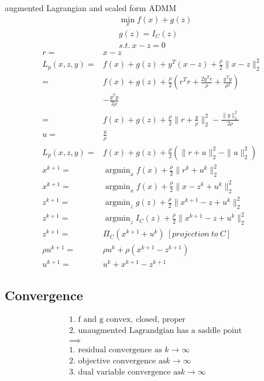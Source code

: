 \documentclass[8pt]{report}
\DeclareMathOperator*{\argmin}{argmin}
\newcommand{\norm}[1]{\|#1\|}
\begin{document}
\begin{multicols*}{2}
  augmented Lagrangian and scaled form ADMM
  \begin{align*}
    &\min_x f(x) + g(z)\\
    &g(z) = I_C(z)\\
    &s.t.\ x-z=0
  \end{align*}
  \begin{align*}
    r=&x-z\\
    L_p(x,z,y) =& f(x) + g(z) + y^T(x-z) + \frac{\rho}{2} \norm{x-z}_2^2\\
               =& f(x) + g(z) + \frac{\rho}{2}(r^T r + \frac{2 y^T r}{\rho} + \frac{y^T y}{\rho^2})\\
                & - \frac{y^T y}{2 \rho}\\
    =& f(x) + g(z) + \frac{\rho}{2} \norm{r+\frac{y}{\rho}}_2^2 - \frac{\norm{y}_2^2}{2\rho}\\
    u=& \frac{y}{\rho}\\
    L_p(x,z,y) =& f(x) + g(z) + \frac{\rho}{2}(\norm{r+u}_2^2 - \norm{u}_2^2)\\
    x^{k+1} =& \argmin_x f(x) + \frac{\rho}{2} \norm{r^k+u^k}_2^2\\
    x^{k+1} =& \argmin_x f(x) + \frac{\rho}{2} \norm{x-z^k+u^k}_2^2\\
    z^{k+1} =& \argmin_z g(z) + \frac{\rho}{2} \norm{x^{k+1}-z+u^k}_2^2\\
    z^{k+1} =& \argmin_z I_C(z) + \frac{\rho}{2} \norm{x^{k+1}-z+u^k}_2^2\\
    z^{k+1} =& \Pi_C(x^{k+1}+u^k)\ [projection\ to\ C]\\
    \rho u^{k+1} =& \rho u^k + \rho (x^{k+1} - z^{k+1})\\
    u^{k+1} =& u^k + x^{k+1} - z^{k+1}
  \end{align*}

  \vfill\null
  \columnbreak
  
  \subsection{Convergence}
  \begin{align*}
    &\text{1. f and g convex, closed, proper}\\
    &\text{2. unaugmented Lagrandgian has a saddle point}\\
    &\implies\\
    &\text{1. residual convergence as }k \rightarrow \infty\\
    &\text{2. objective convergence as}k \rightarrow \infty\\
    &\text{3. dual variable convergence as}k \rightarrow \infty
  \end{align*}
  

\end{multicols*}
\end{document}
